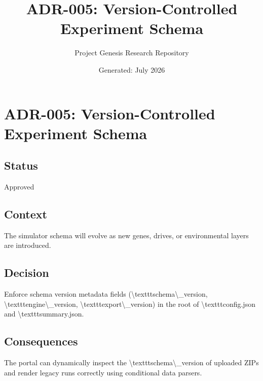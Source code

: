 \documentclass[11pt,a4paper]{article}
\title{\textbf{ADR-005: Version-Controlled Experiment Schema}}
\author{Project Genesis Research Repository}
\date{\small Generated: July 2026}
\begin{document}
\maketitle
\thispagestyle{empty}

\newpage
\section*{ADR-005: Version-Controlled Experiment Schema}

\subsection*{Status}
Approved

\subsection*{Context}
The simulator schema will evolve as new genes, drives, or environmental layers are introduced.

\subsection*{Decision}
Enforce schema version metadata fields (\textbackslash{}texttt{schema\textbackslash{}\_version}, \textbackslash{}texttt{engine\textbackslash{}\_version}, \textbackslash{}texttt{export\textbackslash{}\_version}) in the root of \textbackslash{}texttt{config.json} and \textbackslash{}texttt{summary.json}.

\subsection*{Consequences}
The portal can dynamically inspect the \textbackslash{}texttt{schema\textbackslash{}\_version} of uploaded ZIPs and render legacy runs correctly using conditional data parsers.
\end{document}
